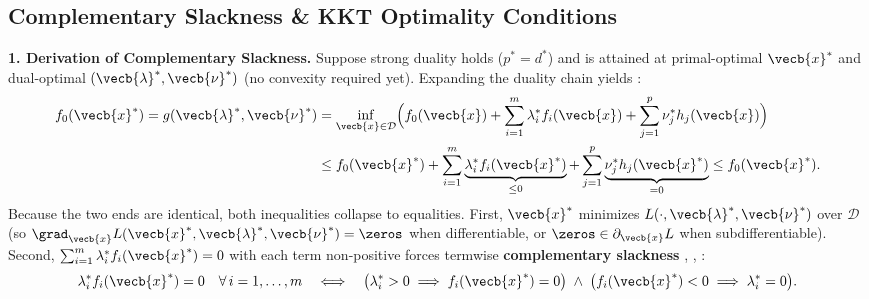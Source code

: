 \documentclass[../../../../master.tex]{subfiles}
\begin{document}
\subsection{Complementary Slackness \& KKT Optimality Conditions}
\label{sec:convex:kkt}

\begin{coremath}
\label{cm:convex:kkt}
\textbf{1. Derivation of Complementary Slackness.} Suppose strong duality holds ($p^* = d^*$) and is attained at primal-optimal $\vecb{x}^*$ and dual-optimal $(\vecb{\lambda}^*, \vecb{\nu}^*)$ (no convexity required yet). Expanding the duality chain yields :
\begin{align}
  f_0(\vecb{x}^*) = g(\vecb{\lambda}^*, \vecb{\nu}^*)
  &= \inf_{\vecb{x} \in \mathcal{D}} \Bigl( f_0(\vecb{x}) + \sum_{i=1}^m \lambda_i^* f_i(\vecb{x}) + \sum_{j=1}^p \nu_j^* h_j(\vecb{x}) \Bigr) \nonumber \\
  &\le f_0(\vecb{x}^*) + \sum_{i=1}^m \underbrace{\lambda_i^* f_i(\vecb{x}^*)}_{\le 0} + \sum_{j=1}^p \underbrace{\nu_j^* h_j(\vecb{x}^*)}_{= 0}
  \le f_0(\vecb{x}^*).
  \label{eq:convex:comp_slack_chain}
\end{align}
Because the two ends are identical, both inequalities collapse to equalities. First, $\vecb{x}^*$ minimizes $L(\cdot, \vecb{\lambda}^*, \vecb{\nu}^*)$ over $\mathcal{D}$ (so $\grad_{\vecb{x}} L(\vecb{x}^*, \vecb{\lambda}^*, \vecb{\nu}^*) = \zeros$ when differentiable, or $\zeros \in \partial_{\vecb{x}} L$ when subdifferentiable). Second, $\sum_{i=1}^m \lambda_i^* f_i(\vecb{x}^*) = 0$ with each term non-positive forces termwise \textbf{complementary slackness} , , :
\begin{equation}
  \lambda_i^* f_i(\vecb{x}^*) = 0 \quad \forall\,i=1,\dots,m
  \quad\Longleftrightarrow\quad
  \bigl(\lambda_i^* > 0 \implies f_i(\vecb{x}^*) = 0\bigr) \;\land\; \bigl(f_i(\vecb{x}^*) < 0 \implies \lambda_i^* = 0\bigr).
  \label{eq:convex:comp_slack}
\end{equation}


\end{coremath}
\end{document}
